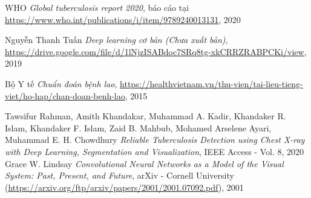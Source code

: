 \begin{thebibliography}{99}
	 WHO {\it Global tuberculosis report 2020}, báo cáo tại \href{https://www.who.int/publications/i/item/9789240013131}{ https://www.who.int/publications/i/item/9789240013131}, 2020
	
	
	 Nguyễn Thanh Tuấn {\it Deep learning cơ bản (Chưa xuất bản)}, \href{https://drive.google.com/file/d/1lNjzISABdoc7SRq8tg-xkCRRZRABPCKi/view}{https://drive.google.com/file/d/1lNjzISABdoc7SRq8tg-xkCRRZRABPCKi/view}, 2019
	
	 Bộ Y tế {\it Chuẩn đoán bệnh lao}, \href{https://healthvietnam.vn/thu-vien/tai-lieu-tieng-viet/ho-hap/chan-doan-benh-lao}{https://healthvietnam.vn/thu-vien/tai-lieu-tieng-viet/ho-hap/chan-doan-benh-lao}, 2015
	
	 Tawsifur Rahman, Amith Khandakar, Muhammad A. Kadir, Khandaker R. Islam, Khandaker F. Islam, Zaid B. Mahbub, Mohamed Arselene Ayari, Muhammad E. H. Chowdhury {\it Reliable Tuberculosis Detection using Chest X-ray with Deep Learning, Segmentation and Visualization}, IEEE Access - Vol. 8, 2020
	 Grace W. Lindsay {\it Convolutional Neural Networks as a Model of the Visual System: Past, Present, and Future}, arXiv - Cornell University (\href{https://arxiv.org/ftp/arxiv/papers/2001/2001.07092.pdf}{https://arxiv.org/ftp/arxiv/papers/2001/2001.07092.pdf}), 2001
\end{thebibliography}
